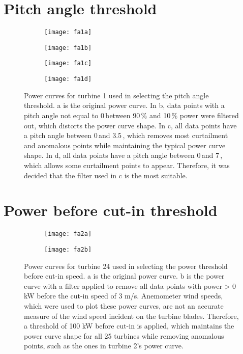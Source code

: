 \chapter{Pitch angle threshold}\label{a1}

\begin{figure}
  \centering
  \begin{subfigure}[t]{.5\textwidth}
    \centering
    \texttt{[image: fa1a]}
    \caption{}
  \end{subfigure}
  \begin{subfigure}[t]{.5\textwidth}
    \centering
    \texttt{[image: fa1b]}
    \caption{}
  \end{subfigure}
  \begin{subfigure}[t]{.49\textwidth}
    \centering
    \texttt{[image: fa1c]}
    \caption{}
  \end{subfigure}
  \begin{subfigure}[t]{.49\textwidth}
    \centering
    \texttt{[image: fa1d]}
    \caption{}
  \end{subfigure}
  \captionsetup{labelformat=empty,list=no}
  \caption{Power curves for turbine 1 used in selecting the pitch angle threshold. a is the original power curve. In b, data points with a pitch angle not equal to 0\,\textdegree between 90\,\% and 10\,\% power were filtered out, which distorts the power curve shape. In c, all data points have a pitch angle between 0\,\textdegree and 3.5\,\textdegree, which removes most curtailment and anomalous points while maintaining the typical power curve shape. In d, all data points have a pitch angle between 0\,\textdegree and 7\,\textdegree, which allows some curtailment points to appear. Therefore, it was decided that the filter used in c is the most suitable.}
\end{figure}

\chapter{Power before cut-in threshold}\label{a2}

\begin{figure}
  \centering
  \begin{subfigure}[t]{.5\textwidth}
    \centering
    \texttt{[image: fa2a]}
    \caption{}
  \end{subfigure}
  \begin{subfigure}[t]{.5\textwidth}
    \centering
    \texttt{[image: fa2b]}
    \caption{}
  \end{subfigure}
  \captionsetup{labelformat=empty,list=no}
  \caption{Power curves for turbine 24 used in selecting the power threshold before cut-in speed. a is the original power curve. b is the power curve with a filter applied to remove all data points with power > 0 kW before the cut-in speed of 3 m/s. Anemometer wind speeds, which were used to plot these power curves, are not an accurate measure of the wind speed incident on the turbine blades. Therefore, a threshold of 100 kW before cut-in is applied, which maintains the power curve shape for all 25 turbines while removing anomalous points, such as the ones in turbine 2's power curve.}
\end{figure}

